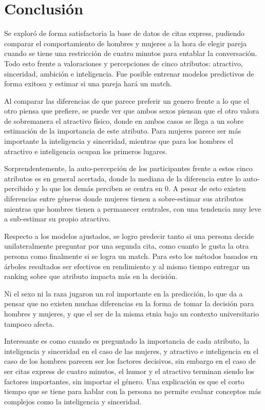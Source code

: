 


\section{Conclusión}

Se exploró de forma satisfactoria la base de datos de citas express, pudiendo comparar el comportamiento de hombres y mujeres a la hora de elegir pareja cuando se tiene una restricción de cuatro minutos para entablar la conversación. Todo esto frente a valoraciones y percepciones de cinco atributos: atractivo, sinceridad, ambición e inteligencia. Fue posible entrenar modelos predictivos de forma exitosa y estimar si una pareja hará un match.

Al comparar las diferencias de que parece preferir un genero frente a lo que el otro piensa que prefiere, se puede ver que ambos sexos piensan que el otro valora de sobremanera el atractivo físico, donde en ambos casos se llega a un sobre estimación de la importancia de este atributo. Para mujeres parece ser más importante la inteligencia y sinceridad, mientras que para los hombres el atractivo e inteligencia ocupan los primeros lugares.

Sorprendentemente, la auto-percepción de los participantes frente a estos cinco atributos es en general acertada, donde la mediana de la diferencia entre lo auto-percibido y lo que los demás perciben se centra en $0$. A pesar de esto existen diferencias entre géneros donde mujeres tienen a sobre-estimar sus atributos mientras que hombres tienen a permanecer centrales, con una tendencia muy leve a sub-estimar su propio atractivo.

Respecto a los modelos ajustados, se logro predecir tanto si una persona decide unilateralmente preguntar por una segunda cita, como cuanto le gusta la otra persona como finalmente si se logra un match. Para esto los métodos basados en árboles resultados ser efectivos en rendimiento y al mismo tiempo entregar un ranking sobre que atributo impacta más en la decisión.

Ni el sexo ni la raza jugaron un rol importante en la predicción, lo que da a pensar que no existen muchas diferencias en la forma de tomar la decisión para hombres y mujeres, y que el ser de la misma etnia bajo un contexto universitario tampoco afecta.

Interesante es como cuando es preguntado la importancia de cada atributo, la inteligencia y sinceridad en el caso de las mujeres, y atractivo e inteligencia en el caso de los hombres parecen ser los factores decisivos, sin embargo en el caso de ser citas express de cuatro minutos, el humor y el atractivo terminan siendo los factores importantes, sin importar el género. Una explicación es que el corto tiempo que se tiene para hablar con la persona no permite evaluar conceptos más complejos como la inteligencia y sinceridad.

